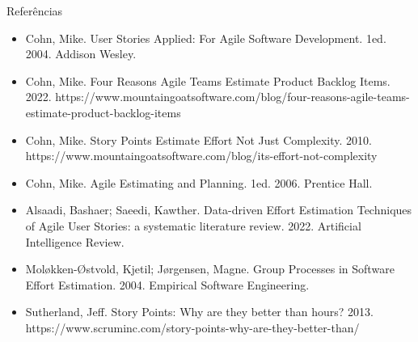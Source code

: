 \documentclass[11pt]{beamer}
\begin{document}
    \begin{frame}{Referências}
        \begin{itemize}
            \item Cohn, Mike. User Stories Applied: For Agile Software Development. 1ed. 2004. Addison Wesley.
            \item Cohn, Mike. Four Reasons Agile Teams Estimate Product Backlog Items. 2022. https://www.mountaingoatsoftware.com/blog/four-reasons-agile-teams-estimate-product-backlog-items
            \item Cohn, Mike. Story Points Estimate Effort Not Just Complexity. 2010. https://www.mountaingoatsoftware.com/blog/its-effort-not-complexity
            \item Cohn, Mike. Agile Estimating and Planning. 1ed. 2006. Prentice Hall.
            \item Alsaadi, Bashaer; Saeedi, Kawther. Data-driven Effort Estimation Techniques of Agile User Stories: a systematic literature review. 2022. Artificial Intelligence Review.
            \item Mol\o{}kken-\O{}stvold, Kjetil; J\o{}rgensen, Magne. Group Processes in Software Effort Estimation. 2004. Empirical Software Engineering.  
            \item Sutherland, Jeff. Story Points: Why are they better than hours? 2013. https://www.scruminc.com/story-points-why-are-they-better-than/
        \end{itemize}
    \end{frame}
\end{document}
